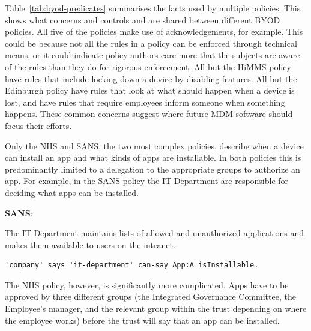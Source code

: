 \documentclass{llncs}
\newenvironment{policyrule}[1]{%
  \begin{mdframed}\footnotesize
      \noindent\textbf{\sffamily #1}:~\itshape%
}{%
  \end{mdframed}
}
\begin{document}
Table~\ref{tab:byod-predicates} summarises the facts used by multiple policies.
This shows what concerns and controls and are shared between different BYOD policies.
All five of the policies make use of acknowledgements, for example.
This could be because not all the rules in a policy can be enforced through technical means, 
  or it could indicate policy authors care more that the subjects are aware of the rules than they do for rigorous enforcement.
All but the HiMMS policy have rules that include locking down a device by disabling features.
All but the Edinburgh policy have rules that look at what should happen when a device is lost,
  and have rules that require employees inform someone when something happens.
These common concerns suggest where future \ac{MDM} software should focus their efforts.

Only the NHS and SANS, the two most complex policies, describe when a device can install an app and what kinds of apps are installable.
In both policies this is predominantly limited to a delegation to the appropriate groups to authorize an app.
For example, in the SANS policy the IT-Department are responsible for deciding what apps can be installed.
\begin{policyrule}{SANS}
  The IT Department maintains lists of allowed and unauthorized applications and makes them available to users on the intranet.
  \normalfont
  \begin{lstlisting}
'company' says 'it-department' can-say App:A isInstallable.
  \end{lstlisting}
\end{policyrule}
The NHS policy, however, is significantly more complicated.
Apps have to be approved by three different groups (the Integrated Governance Committee, the Employee's manager, and the relevant group within the trust depending on where the employee works) before the trust will say that an app can be installed.
\end{document}
